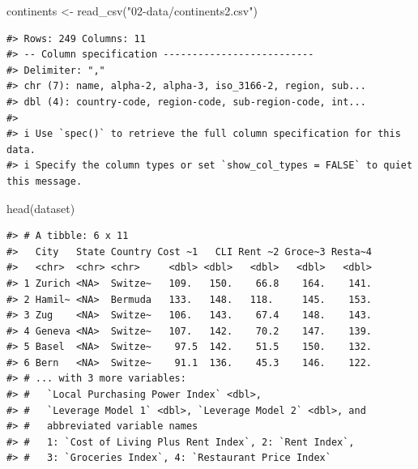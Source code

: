 \documentclass[
  11pt,
  a4paper,
  twoside]{scrbook}
\newenvironment{Shaded}{\begin{snugshade}}{\end{snugshade}}
\newcommand{\FunctionTok}[1]{\textcolor[rgb]{0.00,0.00,0.00}{#1}}
\newcommand{\NormalTok}[1]{#1}
\newcommand{\OtherTok}[1]{\textcolor[rgb]{0.56,0.35,0.01}{#1}}
\newcommand{\StringTok}[1]{\textcolor[rgb]{0.31,0.60,0.02}{#1}}
\begin{document}
\linespread{1}

\begin{Shaded}
\begin{Highlighting}[]
\NormalTok{continents }\OtherTok{\textless{}{-}} \FunctionTok{read\_csv}\NormalTok{(}\StringTok{"02{-}data/continents2.csv"}\NormalTok{)}
\end{Highlighting}
\end{Shaded}

\linespread{1}

\begin{verbatim}
#> Rows: 249 Columns: 11
#> -- Column specification --------------------------
#> Delimiter: ","
#> chr (7): name, alpha-2, alpha-3, iso_3166-2, region, sub...
#> dbl (4): country-code, region-code, sub-region-code, int...
#> 
#> i Use `spec()` to retrieve the full column specification for this data.
#> i Specify the column types or set `show_col_types = FALSE` to quiet this message.
\end{verbatim}

\linespread{1}

\begin{Shaded}
\begin{Highlighting}[]

\FunctionTok{head}\NormalTok{(dataset)}
\end{Highlighting}
\end{Shaded}

\linespread{1}

\begin{verbatim}
#> # A tibble: 6 x 11
#>   City   State Country Cost ~1   CLI Rent ~2 Groce~3 Resta~4
#>   <chr>  <chr> <chr>     <dbl> <dbl>   <dbl>   <dbl>   <dbl>
#> 1 Zurich <NA>  Switze~   109.   150.    66.8    164.    141.
#> 2 Hamil~ <NA>  Bermuda   133.   148.   118.     145.    153.
#> 3 Zug    <NA>  Switze~   106.   143.    67.4    148.    143.
#> 4 Geneva <NA>  Switze~   107.   142.    70.2    147.    139.
#> 5 Basel  <NA>  Switze~    97.5  142.    51.5    150.    132.
#> 6 Bern   <NA>  Switze~    91.1  136.    45.3    146.    122.
#> # ... with 3 more variables:
#> #   `Local Purchasing Power Index` <dbl>,
#> #   `Leverage Model 1` <dbl>, `Leverage Model 2` <dbl>, and
#> #   abbreviated variable names
#> #   1: `Cost of Living Plus Rent Index`, 2: `Rent Index`,
#> #   3: `Groceries Index`, 4: `Restaurant Price Index`
\end{verbatim}

\linespread{1}
\end{document}

